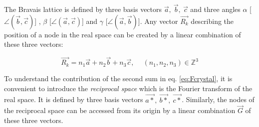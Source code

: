 




The Bravais lattice is defined by three basis vectors $\vec{a},\ \vec{b},\ \vec{c}$ and three angles $\alpha$ [$\angle (\vec{b}, \vec{c})$] , $\beta$ [$\angle (\vec{a}, \vec{c})$] and $\gamma$ [$\angle (\vec{a}, \vec{b})$].
Any vector $\vec{R_k}$ describing the position of a node in the real space can be created by a linear combination of these three vectors:

\begin{equation}
    \label{eq:R_k}
    \vec{R_k}=n_1\vec{a} + n_2\vec{b} + n_3\vec{c}, \quad \ (n_1,n_2,n_3) \in \mathbb{Z}^3
\end{equation}

To understand the contribution of the second sum in eq. \ref{eq:Fcrystal}, it is convenient to introduce the \textit{reciprocal space} which is the Fourier transform of the real space.
It is defined by three basis vectors $\vec{a*},\ \vec{b*},\ \vec{c*}$.
Similarly, the nodes of the reciprocal space can be accessed from its origin by a linear combination $\vec{G}$ of these three vectors.

